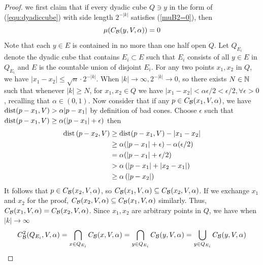 \begin{proof}
    we first claim that if every dyadic cube $Q\ni y$ in the form of (\ref{equ:dyadiccube}) with side length $2^{-|k|}$ satisfies (\ref{muB2=0}), 
    then
    \begin{equation}\label{muBx=0}
        \mu(C_\mathcal B(y, V, \alpha)) = 0
    \end{equation}
    Note that each $y\in E$ is contained in no more than one half open $Q$. Let $Q_{E_i}$ denote the dyadic cube that contains $E_i\subset E$ such that $E_i$ consists of all $y\in E$ in $Q_{E_i}$ and $E$ is the countable union of disjoint $E_i$. For any two points $x_1, x_2$ in $Q$, we have $|x_1-x_2|\leq \sqrt{n}\cdot 2^{-|k|}$. When $|k|\rightarrow \infty, 2^{-|k|}\rightarrow 0$, so there exists $N\in\mathbb{N}$ such that whenever $|k|\geq N$, for $x_1, x_2\in Q$ we have $|x_1-x_2|<\alpha\epsilon/2<\epsilon/2, \forall \epsilon >0$, recalling that $\alpha\in(0,1)$. Now consider that if any $p\in C_\mathcal B(x_1, V, \alpha)$, we have $\operatorname{dist}(p-x_1, V) > \alpha|p-x_1|$ by definition of bad cones. Choose $\epsilon$ such that $\operatorname{dist}(p-x_1, V) \geq \alpha (|p-x_1|+\epsilon)$ then
\begin{equation*}
    \begin{aligned} 
        \operatorname{dist}\left(p-x_{2}, V\right) & \geq \operatorname{dist}(p-x_1, V)-\left|x_1-x_2\right| \\ 
        & \geq \alpha(|p-x_1|+\epsilon)-\alpha(\epsilon / 2) \\ 
        & =\alpha(|p-x_1|+\epsilon / 2) \\ 
        & >\alpha\left(|p-x_1|+\left|x_2-x_1\right|\right) \\ 
        & \geq \alpha\left(\left|p-x_2\right|\right) 
\end{aligned}
\end{equation*}
It follows that $p\in C_{\mathcal B}(x_2, V, \alpha)$, so $ C_{\mathcal B}(x_1, V, \alpha)\subseteq C_{\mathcal B}(x_2, V, \alpha)$. If we exchange $x_1$ and $x_2$ for the proof, $ C_{\mathcal B}(x_2, V, \alpha)\subseteq C_{\mathcal B}(x_1, V, \alpha)$ similarly. Thus, $ C_{\mathcal B}(x_1, V, \alpha)=C_{\mathcal B}(x_2, V, \alpha)$. Since $x_1, x_2$ are arbitrary points in $Q$, we have when $|k|\rightarrow \infty$
\begin{equation}\label{CB2=CB1}
    \begin{split}
        C_\calB^2(Q_{E_i}, V, \alpha) 
        = \bigcap_{x\in Q_{E_i}} C_\calB(x, V, \alpha) 
        = \bigcap_{y\in Q_{E_i}} C_\calB(y, V, \alpha)
        = \bigcup_{y\in Q_{E_i}}C_\calB(y, V, \alpha) 
    \end{split}

\end{equation}
\end{proof}
